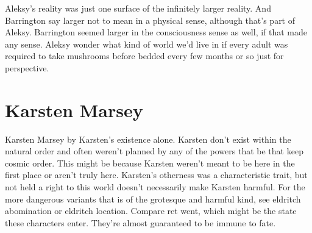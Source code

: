 \documentclass[12pt]{book}
\begin{document}
Aleksy's reality was just one surface of the infinitely larger reality. And Barrington say larger not to mean in a physical sense, although that's part of Aleksy. Barrington seemed larger in the consciousness sense as well, if that made any sense. Aleksy wonder what kind of world we'd live in if every adult was required to take mushrooms before bedded every few months or so just for perspective.



\chapter{Karsten Marsey}

Karsten Marsey by Karsten's existence alone. Karsten don't exist within the natural order and often weren't planned by any of the powers that be that keep cosmic order. This might be because Karsten weren't meant to be here in the first place or aren't truly here. Karsten's otherness was a characteristic trait, but not held a right to this world doesn't necessarily make Karsten harmful. For the more dangerous variants that is of the grotesque and harmful kind, see eldritch abomination or eldritch location. Compare ret went, which might be the state these characters enter. They're almost guaranteed to be immune to fate.
\end{document}
